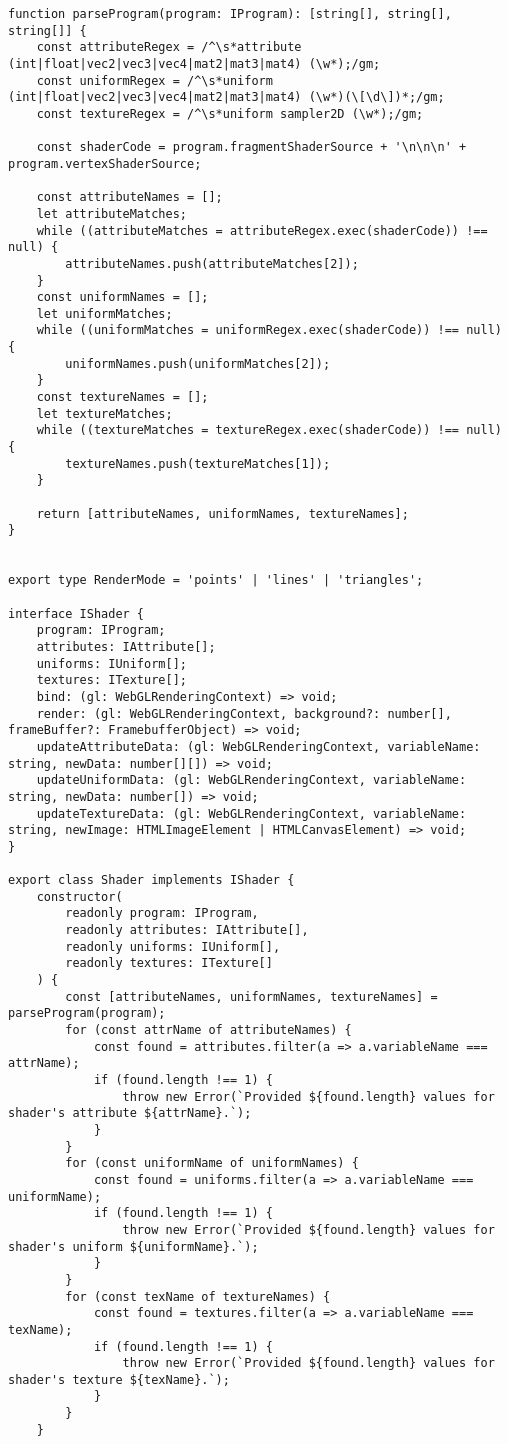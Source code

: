 {\begin{lstlisting}
function parseProgram(program: IProgram): [string[], string[], string[]] {
    const attributeRegex = /^\s*attribute (int|float|vec2|vec3|vec4|mat2|mat3|mat4) (\w*);/gm;
    const uniformRegex = /^\s*uniform (int|float|vec2|vec3|vec4|mat2|mat3|mat4) (\w*)(\[\d\])*;/gm;
    const textureRegex = /^\s*uniform sampler2D (\w*);/gm;

    const shaderCode = program.fragmentShaderSource + '\n\n\n' + program.vertexShaderSource;

    const attributeNames = [];
    let attributeMatches;
    while ((attributeMatches = attributeRegex.exec(shaderCode)) !== null) {
        attributeNames.push(attributeMatches[2]);
    }
    const uniformNames = [];
    let uniformMatches;
    while ((uniformMatches = uniformRegex.exec(shaderCode)) !== null) {
        uniformNames.push(uniformMatches[2]);
    }
    const textureNames = [];
    let textureMatches;
    while ((textureMatches = textureRegex.exec(shaderCode)) !== null) {
        textureNames.push(textureMatches[1]);
    }

    return [attributeNames, uniformNames, textureNames];
}


export type RenderMode = 'points' | 'lines' | 'triangles';

interface IShader {
    program: IProgram;
    attributes: IAttribute[];
    uniforms: IUniform[];
    textures: ITexture[];
    bind: (gl: WebGLRenderingContext) => void;
    render: (gl: WebGLRenderingContext, background?: number[], frameBuffer?: FramebufferObject) => void;
    updateAttributeData: (gl: WebGLRenderingContext, variableName: string, newData: number[][]) => void;
    updateUniformData: (gl: WebGLRenderingContext, variableName: string, newData: number[]) => void;
    updateTextureData: (gl: WebGLRenderingContext, variableName: string, newImage: HTMLImageElement | HTMLCanvasElement) => void;
}

export class Shader implements IShader {
    constructor(
        readonly program: IProgram,
        readonly attributes: IAttribute[],
        readonly uniforms: IUniform[],
        readonly textures: ITexture[]
    ) {
        const [attributeNames, uniformNames, textureNames] = parseProgram(program);
        for (const attrName of attributeNames) {
            const found = attributes.filter(a => a.variableName === attrName);
            if (found.length !== 1) {
                throw new Error(`Provided ${found.length} values for shader's attribute ${attrName}.`);
            }
        }
        for (const uniformName of uniformNames) {
            const found = uniforms.filter(a => a.variableName === uniformName);
            if (found.length !== 1) {
                throw new Error(`Provided ${found.length} values for shader's uniform ${uniformName}.`);
            }
        }
        for (const texName of textureNames) {
            const found = textures.filter(a => a.variableName === texName);
            if (found.length !== 1) {
                throw new Error(`Provided ${found.length} values for shader's texture ${texName}.`);
            }
        }
    }


\end{lstlisting}}
